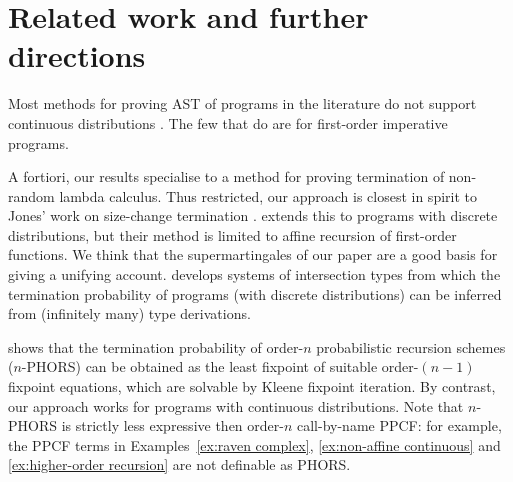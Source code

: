 \section{Related work and further directions}
\label{sec:related}

 

Most methods for proving AST of programs in the literature do not support continuous distributions \citep{DBLP:journals/toplas/LagoG19,DBLP:journals/jacm/KaminskiKMO18,DBLP:conf/lics/OlmedoKKM16,DBLP:conf/lics/KobayashiLG19,DBLP:conf/mfcs/KaminskiK15,DBLP:series/mcs/McIverM05}.
The few that do \citep{DBLP:conf/popl/FioritiH15,DBLP:conf/pldi/ChenH20,DBLP:journals/toplas/ChatterjeeFNH18} are for first-order imperative programs.

A fortiori, our results specialise to a method for proving termination of non-random lambda calculus. 
Thus restricted, our approach is closest in spirit to Jones' work on size-change termination \citep{DBLP:journals/lmcs/JonesB08,DBLP:conf/aplas/SereniJ05}. 
\cite{DBLP:journals/toplas/LagoG19} extends this to programs with discrete distributions, but their method is limited to affine recursion of first-order functions.
We think that the supermartingales of our paper are a good basis for giving a unifying account.
\cite{DBLP:conf/ppdp/BreuvartL18} develops systems of intersection types from which the termination probability of programs (with discrete distributions) can be inferred from (infinitely many) type derivations.  

\cite{DBLP:conf/lics/KobayashiLG19} shows that the termination probability of order-$n$ probabilistic recursion schemes ($n$-PHORS) can be obtained as the least fixpoint of suitable order-$(n-1)$ fixpoint equations, which are solvable by Kleene fixpoint iteration.  
By contrast, our approach works for programs with continuous distributions. 
Note that $n$-PHORS is strictly less expressive then order-$n$ call-by-name PPCF:
for example, the PPCF terms in Examples~\ref{ex:raven complex},
\ref{ex:non-affine continuous} and
\ref{ex:higher-order recursion}
are not definable as PHORS.


